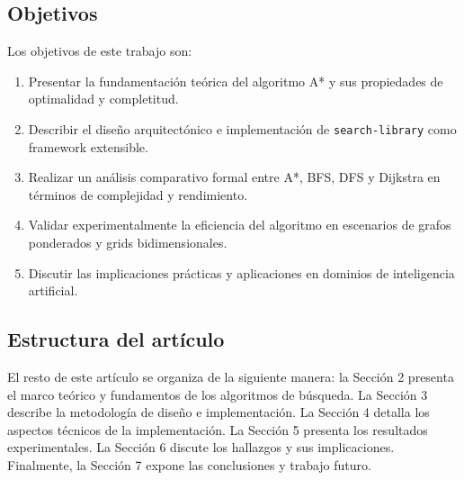 \subsection{Objetivos}

Los objetivos de este trabajo son:

\begin{enumerate}
    \item Presentar la fundamentación teórica del algoritmo A* y sus propiedades de optimalidad y completitud.
    \item Describir el diseño arquitectónico e implementación de \texttt{search-library} como framework extensible.
    \item Realizar un análisis comparativo formal entre A*, BFS, DFS y Dijkstra en términos de complejidad y rendimiento.
    \item Validar experimentalmente la eficiencia del algoritmo en escenarios de grafos ponderados y grids bidimensionales.
    \item Discutir las implicaciones prácticas y aplicaciones en dominios de inteligencia artificial.
\end{enumerate}

\subsection{Estructura del artículo}

El resto de este artículo se organiza de la siguiente manera: la Sección 2 presenta el marco teórico y fundamentos de los algoritmos de búsqueda. La Sección 3 describe la metodología de diseño e implementación. La Sección 4 detalla los aspectos técnicos de la implementación. La Sección 5 presenta los resultados experimentales. La Sección 6 discute los hallazgos y sus implicaciones. Finalmente, la Sección 7 expone las conclusiones y trabajo futuro.

